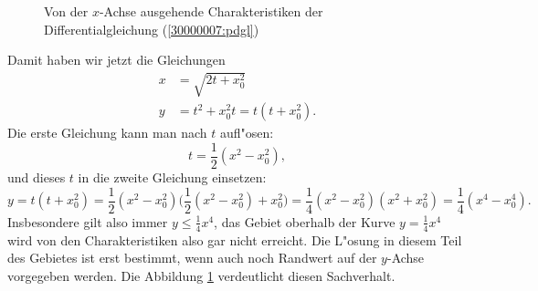 \begin{loesung}
\begin{figure}
\begin{center}
\end{center}
\caption{Von der $x$-Achse ausgehende Charakteristiken der
Differentialgleichung (\ref{30000007:pdgl})
\label{30000007:chardom}}
\end{figure}
Damit haben wir jetzt die Gleichungen
\begin{align*}
x&=\sqrt{2t+x_0^2}\\
y&=t^2+x_0^2t = t(t+x_0^2).
\end{align*}
Die erste Gleichung kann man nach $t$ aufl"osen:
\[
t=\frac12(x^2-x_0^2),
\]
und dieses $t$ in die zweite Gleichung einsetzen:
\begin{equation}
y=t(t+x_0^2)=\frac12(x^2-x_0^2)\biggl(\frac12(x^2-x_0^2)+x_0^2\biggr)
=\frac14(x^2-x_0^2)(x^2+x_0^2)=\frac14(x^4-x_0^4).
\label{30000007:char}
\end{equation}
Insbesondere gilt also immer $y\le\frac14x^4$, das Gebiet oberhalb
der Kurve $y=\frac14x^4$ wird von den Charakteristiken also gar nicht
erreicht. Die L"osung in diesem Teil des Gebietes ist erst bestimmt,
wenn auch noch Randwert auf der $y$-Achse vorgegeben werden. Die
Abbildung \ref{30000007:chardom} verdeutlicht diesen Sachverhalt.
\end{loesung}

